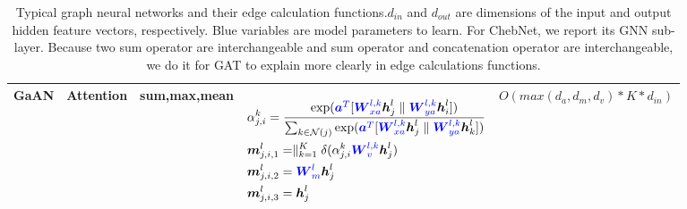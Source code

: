 \begin{table}
\begin{footnotesize}
\begin{tabular}{ccp{8em}p{22em}r}
			\textbf{GaAN}                                                                                                             &
			Attention                                                                                                                 &
			sum,max,mean                                                                                                              &
			\begin{scriptsize}
				$\begin{aligned}[t]
						 & \alpha_{j, i}^k = \frac {\exp(\textcolor{blue}{\boldsymbol{a}^T} [ \textcolor{blue}{\boldsymbol{W}^{l, k}_{xa}} \boldsymbol{h}_j^l \parallel \textcolor{blue}{\boldsymbol{W}^{l,k}_{ya}} \boldsymbol{h}_i^l] )} {\sum_{k \in \mathcal{N}(j)}\exp(\textcolor{blue}{\boldsymbol{a}^T} [ \textcolor{blue}{\boldsymbol{W}^{l,k}_{xa}} \boldsymbol{h}_j^l \parallel \textcolor{blue}{\boldsymbol{W}^{l,k}_{ya}}  \boldsymbol{h}_k^l] )} \\
						 & \boldsymbol{m}_{j, i, 1}^l = \parallel_{k=1}^K \delta(\alpha_{j, i}^k \textcolor{blue}{\boldsymbol{W}^{l,k}_v} \boldsymbol{h}_j^{l})                                                                                                                                                                                                                                                                                               \\
						 & \boldsymbol{m}_{j, i, 2}^l = \textcolor{blue}{\boldsymbol{W}^l_m} \boldsymbol{h}_j^{l}                                                                                                                                                                                                                                                                                                                                             \\
						 & \boldsymbol{m}_{j, i, 3}^l = \boldsymbol{h}_j^l
					\end{aligned}$
			\end{scriptsize}                                                                                            &
			$O(max(d_a, d_m, d_v) * K * d_{in})$                                                                                        \\
			\bottomrule
		\end{tabular}
	\end{footnotesize}
	\caption{Typical graph neural networks and their edge calculation functions.$d_{in}$ and $d_{out}$ are dimensions of the input and output hidden feature vectors, respectively.
		Blue variables are model parameters to learn. For ChebNet, we report its GNN sub-layer. Because two sum operator are interchangeable and sum operator and concatenation operator are interchangeable, we do it for GAT to explain more clearly in edge calculations functions.}
	\label{tab:gnn_overview_edge}
\end{table}

